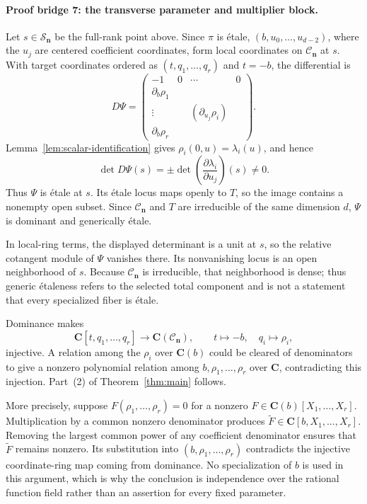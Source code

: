 \documentclass[11pt]{article}
\theoremstyle{definition}
\theoremstyle{remark}
\newcommand{\C}{\mathbf C}
\newcommand{\cC}{\mathcal C}
\newcommand{\cS}{\mathcal S}
\newcommand{\bn}{\mathbf n}
\begin{document}
\paragraph{Proof bridge 7: the transverse parameter and multiplier block.}
Let $s\in\cS_{\bn}$ be the full-rank point above.  Since $\pi$ is étale,
$(b,u_0,\ldots,u_{d-2})$, where the $u_j$ are centered coefficient
coordinates, form local coordinates on $\cC_{\bn}$ at $s$.  With target
coordinates ordered as $(t,q_1,\ldots,q_r)$ and $t=-b$, the differential is
\[
  D\Psi
  =
  \begin{pmatrix}
    -1&0&\cdots&0\\
    \partial_b\rho_1&&&\\
    \vdots&&
      \left(\partial_{u_j}\rho_i\right)&\\
    \partial_b\rho_r&&&
  \end{pmatrix}.
\]
Lemma~\ref{lem:scalar-identification} gives
$\rho_i(0,u)=\lambda_i(u)$, and hence
\[
  \det D\Psi(s)
  =
  \pm
  \det\left(
    \frac{\partial\lambda_i}{\partial u_j}
  \right)(s)
  \neq0.
\]
Thus $\Psi$ is étale at $s$.  Its étale locus maps openly to $T$, so the
image contains a nonempty open subset.  Since $\cC_{\bn}$ and $T$ are
irreducible of the same dimension $d$, $\Psi$ is dominant and generically
étale.

In local-ring terms, the displayed determinant is a unit at $s$, so the
relative cotangent module of $\Psi$ vanishes there.  Its nonvanishing locus
is an open neighborhood of $s$.  Because $\cC_{\bn}$ is irreducible, that
neighborhood is dense; thus generic étaleness refers to the selected total
component and is not a statement that every specialized fiber is étale.

Dominance makes
\[
  \C[t,q_1,\ldots,q_r]\longrightarrow\C(\cC_{\bn}),
  \qquad
  t\longmapsto-b,\quad q_i\longmapsto\rho_i,
\]
injective.  A relation among the $\rho_i$ over $\C(b)$ could be cleared of
denominators to give a nonzero polynomial relation among
$b,\rho_1,\ldots,\rho_r$ over $\C$, contradicting this injection.  Part~(2)
of Theorem~\ref{thm:main} follows.

More precisely, suppose
$F(\rho_1,\ldots,\rho_r)=0$ for a nonzero
$F\in\C(b)[X_1,\ldots,X_r]$.  Multiplication by a common nonzero denominator
produces $\widetilde F\in\C[b,X_1,\ldots,X_r]$.  Removing the largest common
power of any coefficient denominator ensures that $\widetilde F$ remains
nonzero.  Its substitution into $(b,\rho_1,\ldots,\rho_r)$ contradicts the
injective coordinate-ring map coming from dominance.  No specialization of
$b$ is used in this argument, which is why the conclusion is independence
over the rational function field rather than an assertion for every fixed
parameter.
\end{document}
